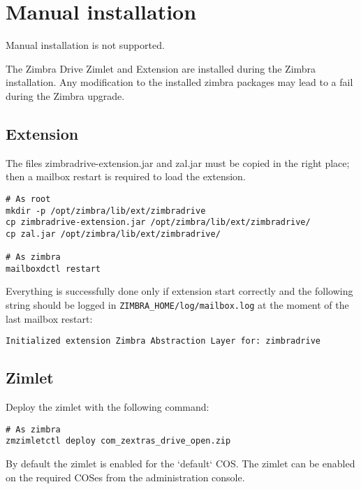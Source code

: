 \section{Manual installation}

\begin{comment}
WARNING:
\end{comment}
\begin{warning}
    Manual installation is not supported.

    The Zimbra Drive Zimlet and Extension are installed during the Zimbra installation.
    Any modification to the installed zimbra packages may lead to a fail during the Zimbra upgrade.
\end{warning}

\subsection{Extension}
    The files zimbradrive-extension.jar and zal.jar must be copied in the right place;
    then a mailbox restart is required to load the extension.
    \begin{verbatim}
# As root
mkdir -p /opt/zimbra/lib/ext/zimbradrive
cp zimbradrive-extension.jar /opt/zimbra/lib/ext/zimbradrive/
cp zal.jar /opt/zimbra/lib/ext/zimbradrive/

# As zimbra
mailboxdctl restart
    \end{verbatim}
    Everything is successfully done only if extension start correctly and the following string
    should be logged in \texttt{ZIMBRA\_HOME/log/mailbox.log} at the moment of the last mailbox restart:
    \begin{verbatim}
Initialized extension Zimbra Abstraction Layer for: zimbradrive
    \end{verbatim}

\subsection{Zimlet}
    Deploy the zimlet with the following command:
    \begin{verbatim}
# As zimbra
zmzimletctl deploy com_zextras_drive_open.zip
    \end{verbatim}
    By default the zimlet is enabled for the `default` COS.
    The zimlet can be enabled on the required COSes from the administration console.
